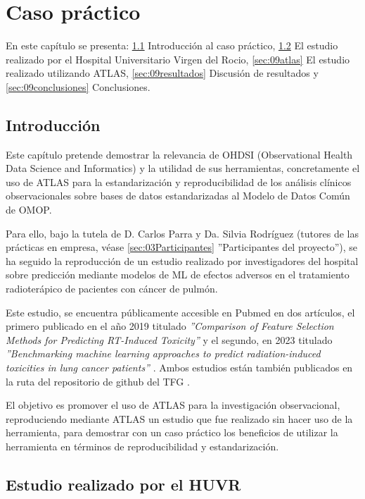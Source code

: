 \chapter{Caso práctico}\label{cap:09caso}
En este capítulo se presenta: \ref{sec:09intro} Introducción al caso práctico, \ref{sec:09huvr} El estudio realizado por el Hospital Universitario Virgen del Rocio, \ref{sec:09atlas} El estudio realizado utilizando ATLAS, \ref{sec:09resultados} Discusión de resultados y \ref{sec:09conclusiones} Conclusiones.

\section{Introducción} \label{sec:09intro}

Este capítulo pretende demostrar la relevancia de OHDSI (Observational Health Data Science and Informatics) y la utilidad de sus herramientas, concretamente el uso de ATLAS para la estandarización y reproducibilidad de los análisis clínicos observacionales sobre bases de datos estandarizadas al Modelo de Datos Común de OMOP. 

Para ello, bajo la tutela de D. Carlos Parra y Da. Silvia Rodríguez (tutores de las prácticas en empresa, véase \ref{sec:03Participantes} ''Participantes del proyecto''), se ha seguido la reproducción de un estudio realizado por investigadores del hospital sobre predicción mediante modelos de ML de efectos adversos en el tratamiento radioterápico de pacientes con cáncer de pulmón. 

Este estudio, se encuentra públicamente accesible en Pubmed en dos artículos, el primero publicado en el año 2019 titulado \textit{''Comparison of Feature Selection Methods for Predicting RT-Induced Toxicity'' }\cite{nunez2019comparison} y el segundo, en 2023 titulado \textit{''Benchmarking machine learning approaches to predict radiation-induced toxicities in lung cancer patients''} \cite{nunez2023benchmarking}. Ambos estudios están también publicados en la ruta  del repositorio de github del TFG \cite{vallealonsodc}.

El objetivo es promover el uso de ATLAS para la investigación observacional, reproduciendo mediante ATLAS un estudio que fue realizado sin hacer uso de la herramienta, para demostrar con un caso práctico los beneficios de utilizar la herramienta en términos de reproducibilidad y estandarización.

\section{Estudio realizado por el HUVR} \label{sec:09huvr}

